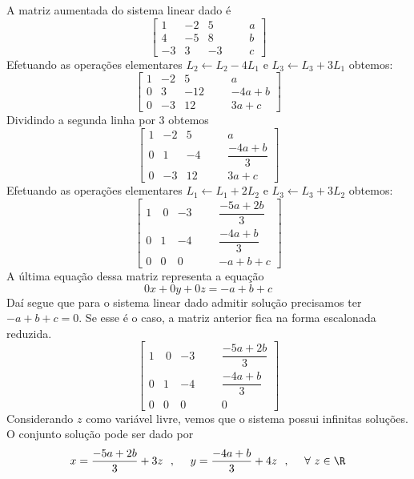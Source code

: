 \begin{solution}
A matriz aumentada do sistema linear dado é
$$ \left[\begin{array}{rrrr|rc}
  1 &  -2 &   5 & & &   a  \\
  4 &  -5 &   8 & & &   b  \\ 
 -3 &   3 &  -3 & & &   c  \end{array}\right] $$
Efetuando as operações elementares $L_2 \leftarrow L_2 - 4L_1$ e $L_3 \leftarrow L_3 + 3L_1$ obtemos:
$$ \left[\begin{array}{rrrr|rc}
  1 &  -2 &    5 & & &   a      \\
  0 &   3 &  -12 & & &   -4a+b  \\ 
  0 &  -3 &   12 & & &   3a+c   \end{array}\right] $$
Dividindo a segunda linha por 3 obtemos
$$ \left[\begin{array}{rrrr|rc}
  1 &  -2 &    5 & & &   a                  \\[6pt]
  0 &   1 &   -4 & & &   \dfrac{-4a+b}{3}   \\[10pt] 
  0 &  -3 &   12 & & &   3a+c               \end{array}\right] $$
Efetuando as operações elementares $L_1 \leftarrow L_1 + 2L_2$ e $L_3 \leftarrow L_3 + 3L_2$ obtemos:
$$ \left[\begin{array}{rrrr|rc}
  1 & \  0 &   -3 & & &   \dfrac{-5a+2b}{3}  \\[10pt]
  0 &    1 &   -4 & & &   \dfrac{-4a+b}{3}   \\[10pt]
  0 &    0 &    0 & & &   -a+b+c             \end{array}\right] $$
A última equação dessa matriz representa a equação
$$0x + 0y + 0z = -a+b+c$$
Daí segue que para o sistema linear dado admitir solução precisamos ter $-a+b+c=0$. Se esse é o caso, a matriz anterior fica na forma escalonada reduzida.
$$ \left[\begin{array}{rrrr|rc}
  1 & \  0 &   -3 & & &   \dfrac{-5a+2b}{3}  \\[10pt]
  0 &    1 &   -4 & & &   \dfrac{-4a+b}{3}   \\[10pt] 
  0 &    0 &    0 & & &   0                  \end{array}\right] $$
Considerando $z$ como variável livre, vemos que o sistema possui infinitas soluções. O conjunto solução pode ser dado por
$$x=\dfrac{-5a+2b}{3} + 3z\ \ , \ \ \ \ y = \dfrac{-4a+b}{3} + 4z\ \ , \ \ \ \ \forall\ z \in \R $$
\end{solution}

